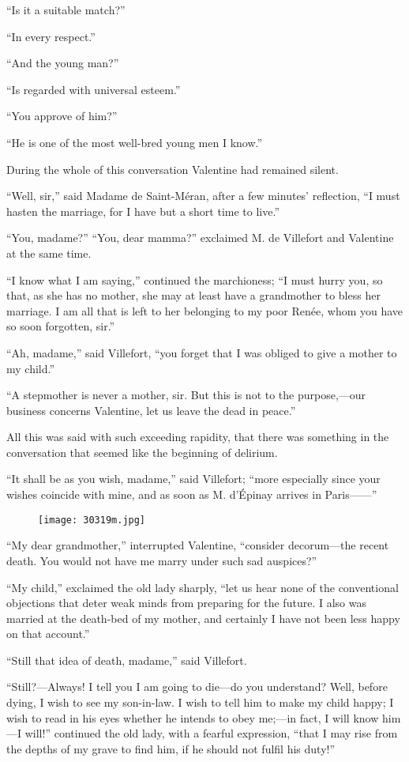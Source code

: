 “Is it a suitable match?”

“In every respect.”

“And the young man?”

“Is regarded with universal esteem.”

“You approve of him?”

“He is one of the most well-bred young men I know.”

During the whole of this conversation Valentine had remained silent.

“Well, sir,” said Madame de Saint-Méran, after a few minutes’
reflection, “I must hasten the marriage, for I have but a short time to
live.”

“You, madame?” “You, dear mamma?” exclaimed M. de Villefort and
Valentine at the same time.

“I know what I am saying,” continued the marchioness; “I must hurry
you, so that, as she has no mother, she may at least have a grandmother
to bless her marriage. I am all that is left to her belonging to my
poor Renée, whom you have so soon forgotten, sir.”

“Ah, madame,” said Villefort, “you forget that I was obliged to give a
mother to my child.”

“A stepmother is never a mother, sir. But this is not to the
purpose,—our business concerns Valentine, let us leave the dead in
peace.”

All this was said with such exceeding rapidity, that there was
something in the conversation that seemed like the beginning of
delirium.

“It shall be as you wish, madame,” said Villefort; “more especially
since your wishes coincide with mine, and as soon as M. d’Épinay
arrives in Paris——”

\begin{figure}[ht]
\texttt{[image: 30319m.jpg]}
\end{figure}

“My dear grandmother,” interrupted Valentine, “consider decorum—the
recent death. You would not have me marry under such sad auspices?”

“My child,” exclaimed the old lady sharply, “let us hear none of the
conventional objections that deter weak minds from preparing for the
future. I also was married at the death-bed of my mother, and certainly
I have not been less happy on that account.”

“Still that idea of death, madame,” said Villefort.

“Still?—Always! I tell you I am going to die—do you understand? Well,
before dying, I wish to see my son-in-law. I wish to tell him to make
my child happy; I wish to read in his eyes whether he intends to obey
me;—in fact, I will know him—I will!” continued the old lady, with a
fearful expression, “that I may rise from the depths of my grave to
find him, if he should not fulfil his duty!”

